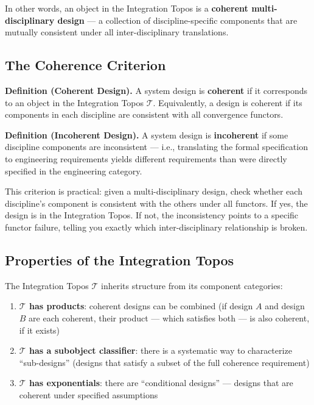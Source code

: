 \documentclass[11pt,a4paper]{article}
\begin{document}
In other words, an object in the Integration Topos is a \textbf{coherent multi-disciplinary design} --- a collection of discipline-specific components that are mutually consistent under all inter-disciplinary translations.

\subsection{The Coherence Criterion}

\textbf{Definition (Coherent Design).} A system design is \textbf{coherent} if it corresponds to an object in the Integration Topos $\mathcal{T}$. Equivalently, a design is coherent if its components in each discipline are consistent with all convergence functors.

\textbf{Definition (Incoherent Design).} A system design is \textbf{incoherent} if some discipline components are inconsistent --- i.e., translating the formal specification to engineering requirements yields different requirements than were directly specified in the engineering category.

This criterion is practical: given a multi-disciplinary design, check whether each discipline's component is consistent with the others under all functors. If yes, the design is in the Integration Topos. If not, the inconsistency points to a specific functor failure, telling you exactly which inter-disciplinary relationship is broken.

\subsection{Properties of the Integration Topos}

The Integration Topos $\mathcal{T}$ inherits structure from its component categories:

\begin{enumerate}
    \item \textbf{$\mathcal{T}$ has products}: coherent designs can be combined (if design $A$ and design $B$ are each coherent, their product --- which satisfies both --- is also coherent, if it exists)
    \item \textbf{$\mathcal{T}$ has a subobject classifier}: there is a systematic way to characterize ``sub-designs'' (designs that satisfy a subset of the full coherence requirement)
    \item \textbf{$\mathcal{T}$ has exponentials}: there are ``conditional designs'' --- designs that are coherent under specified assumptions
\end{enumerate}
\end{document}
